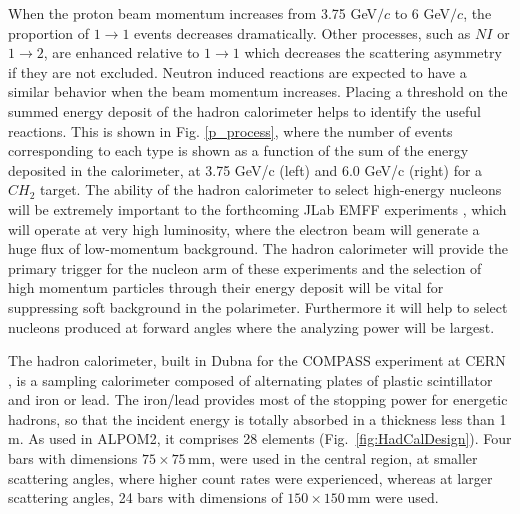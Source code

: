 \documentclass[epj]{svjour}
\begin{document}
When the proton beam momentum increases from 3.75 GeV$/c$ to 6 GeV$/c$, the proportion of  $1 \to 1$ events decreases dramatically. Other processes, such as $NI$ or $1 \to 2$, are enhanced relative to $1 \to 1$ which decreases the scattering asymmetry if they are not excluded. Neutron induced reactions are expected to have a similar behavior when the beam momentum increases. Placing a threshold on the summed energy deposit of the hadron calorimeter helps to identify the useful reactions. This is shown in Fig. \ref{p_process}, where the number of events corresponding to each type is shown as a function of the sum of the energy deposited in the calorimeter, at 3.75 GeV/c (left) and 6.0 GeV/c (right) for a $CH_2$ target.
%
%
The ability of the hadron calorimeter to select high-energy nucleons will be extremely important to the forthcoming  JLab EMFF experiments \cite{PR12-17-004,PR12-07-109}, which will operate at very high luminosity, where the electron beam will generate a huge flux of low-momentum background. The hadron calorimeter will provide the primary trigger for the nucleon arm of these experiments and the selection of high momentum particles through their energy deposit will be vital for suppressing soft background in the polarimeter. Furthermore it will help to select nucleons produced at forward angles where the analyzing power will be largest.




The hadron calorimeter, built in Dubna for the COMPASS experiment at CERN  \cite{Vlasov:2006,abbon:2007},  is a sampling calorimeter composed of alternating plates of plastic scintillator and iron or lead. The iron/lead provides most of the stopping power for energetic hadrons, so that the incident energy is totally absorbed in a thickness  less than 1 m. As used in ALPOM2, it comprises  28 elements (Fig.~\ref{fig:HadCalDesign}). Four bars with dimensions $75\times75$\,mm,  were used in the central region, at smaller scattering angles, where higher count rates were experienced,  whereas at larger scattering angles, 24 bars with dimensions of $150\times150$\,mm were used.
\end{document}

